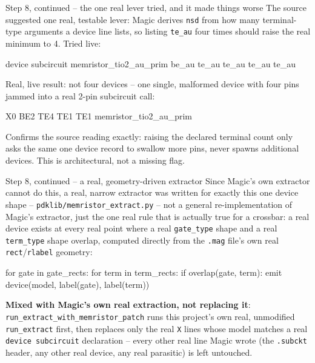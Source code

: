 \documentclass[aspectratio=169,9pt]{beamer}
\begin{document}
\begin{frame}[fragile]{Step 8, continued -- the one real lever tried, and it made things worse}
The source suggested one real, testable lever: Magic derives
\texttt{nsd} from how many terminal-type arguments a device line
lists, so listing \texttt{te\_au} four times should raise the real
minimum to 4. Tried live:
\begin{cli}
device subcircuit memristor_tio2_au_prim be_au te_au te_au te_au te_au
\end{cli}
\footnotesize
Real, live result: not four devices -- one single, malformed device
with four pins jammed into a real 2-pin subcircuit call:
\begin{cli}
X0 BE2 TE4 TE1 TE1 memristor_tio2_au_prim
\end{cli}
Confirms the source reading exactly: raising the declared terminal
count only asks the same one device record to swallow more pins, never
spawns additional devices. This is architectural, not a missing flag.
\end{frame}

\begin{frame}[fragile]{Step 8, continued -- a real, geometry-driven extractor}
Since Magic's own extractor cannot do this, a real, narrow extractor
was written for exactly this one device shape --
\texttt{pdklib/memristor\_extract.py} -- not a general re-implementation
of Magic's extractor, just the one real rule that is actually true for
a crossbar: a real device exists at every real point where a real
\texttt{gate\_type} shape and a real \texttt{term\_type} shape overlap,
computed directly from the \texttt{.mag} file's own real
\texttt{rect}/\texttt{rlabel} geometry:
\begin{cli}
for gate in gate_rects:
    for term in term_rects:
        if overlap(gate, term):
            emit device(model, label(gate), label(term))
\end{cli}
\footnotesize
\textbf{Mixed with Magic's own real extraction, not replacing it}:
\texttt{run\_extract\_with\_memristor\_patch} runs this project's own
real, unmodified \texttt{run\_extract} first, then replaces only the
real \texttt{X} lines whose model matches a real \texttt{device
subcircuit} declaration -- every other real line Magic wrote (the
\texttt{.subckt} header, any other real device, any real parasitic)
is left untouched.
\end{frame}
\end{document}
